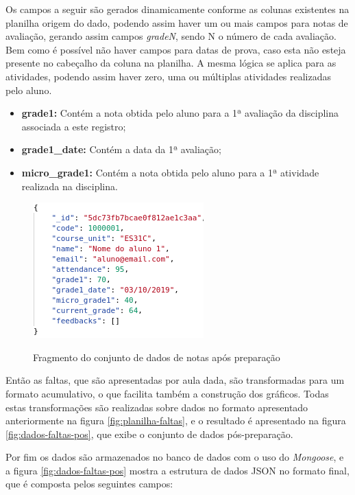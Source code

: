 Os campos a seguir são gerados dinamicamente conforme as colunas existentes na planilha origem do dado, podendo assim haver um ou mais campos para notas de avaliação, gerando assim campos \textit{gradeN}, sendo N o número de cada avaliação.
Bem como é possível não haver campos para datas de prova, caso esta não esteja presente no cabeçalho da coluna na planilha.
A mesma lógica se aplica para as atividades, podendo assim haver zero, uma ou múltiplas atividades realizadas pelo aluno.

\begin{itemize}[topsep=5pt]
    \item \textbf{grade1:} Contém a nota obtida pelo aluno para a 1ª avaliação da disciplina associada a este registro;
    \item \textbf{grade1\_date:} Contém a data da 1ª avaliação;
    \item \textbf{micro\_grade1:} Contém a nota obtida pelo aluno para a 1ª atividade realizada na disciplina.
\end{itemize}

\begin{figure}[!htb]
    \centering
    \caption{Fragmento do conjunto de dados de notas após preparação}
    \includegraphics[height=0.35\textwidth]{./dados/figuras/dados-notas-pos}
    \label{fig:dados-notas-pos}
\end{figure}

Então as faltas, que são apresentadas por aula dada, são transformadas para um formato acumulativo, o que facilita também a construção dos gráficos.
Todas estas transformações são realizadas sobre dados no formato apresentado anteriormente na figura \ref{fig:planilha-faltas}, e o resultado é apresentado na figura \ref{fig:dados-faltas-pos}, que exibe o conjunto de dados pós-preparação.

Por fim os dados são armazenados no banco de dados com o uso do \textit{Mongoose}, e a figura \ref{fig:dados-faltas-pos} mostra a estrutura de dados JSON no formato final, que é composta pelos seguintes campos:

